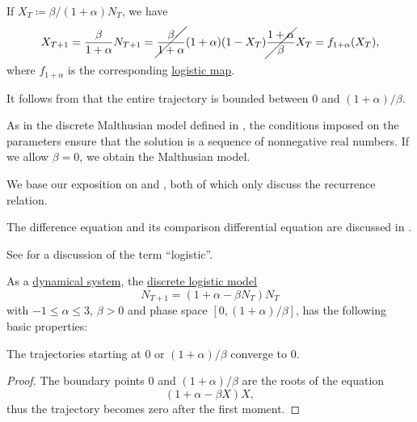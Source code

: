 \begin{comments}
  \item If \( X_T \coloneqq \beta / (1 + \alpha) N_T \), we have
  \begin{equation*}
    X_{T+1}
    =
    \frac \beta {1 + \alpha} N_{T+1}
    =
    \cancel{\frac \beta {1 + \alpha}} (1 + \alpha) (1 - X_T) \cancel{\frac {1 + \alpha} \beta} X_T
    =
    f_{1 + \alpha}(X_T),
  \end{equation*}
  where \( f_{1 + \alpha} \) is the corresponding \hyperref[def:logistic_map]{logistic map}.

  It follows from  that the entire trajectory is bounded between \( 0 \) and \( (1 + \alpha) / \beta \).

  \item As in the discrete Malthusian model defined in , the conditions imposed on the parameters ensure that the solution is a sequence of nonnegative real numbers. If we allow \( \beta = 0 \), we obtain the Malthusian model.

  \item We base our exposition on \cite[18]{Юмагулов2015ДинамическиеСистемы} and \cite[45]{EdelsteinKeshet2005MathematicalModelsInBiology}, both of which only discuss the recurrence relation.

  The difference equation and its comparison differential equation are discussed in \cite{MathSE:discrete_vs_continuous_logistic_model}.

  \item See  for a discussion of the term \enquote{logistic}.
\end{comments}

\begin{proposition}\label{thm:discrete_logistic_model_dynamics}
  As a \hyperref[def:dynamical_system]{dynamical system}, the \hyperref[def:discrete_logistic_model]{discrete logistic model}
  \begin{equation*}
    N_{T+1} = (1 + \alpha - \beta N_T) N_T
  \end{equation*}
  with \( -1 \leq \alpha \leq 3 \), \( \beta > 0 \) and phase space \( [0, (1 + \alpha) / \beta] \), has the following basic properties:
  \begin{thmenum}
     The trajectories starting at \( 0 \) or \( (1 + \alpha) / \beta \) converge to \( 0 \).
  \end{thmenum}
\end{proposition}
\begin{proof}
   The boundary points \( 0 \) and \( (1 + \alpha) / \beta \) are the roots of the equation
  \begin{equation*}
    (1 + \alpha - \beta X) X,
  \end{equation*}
  thus the trajectory becomes zero after the first moment.
\end{proof}
